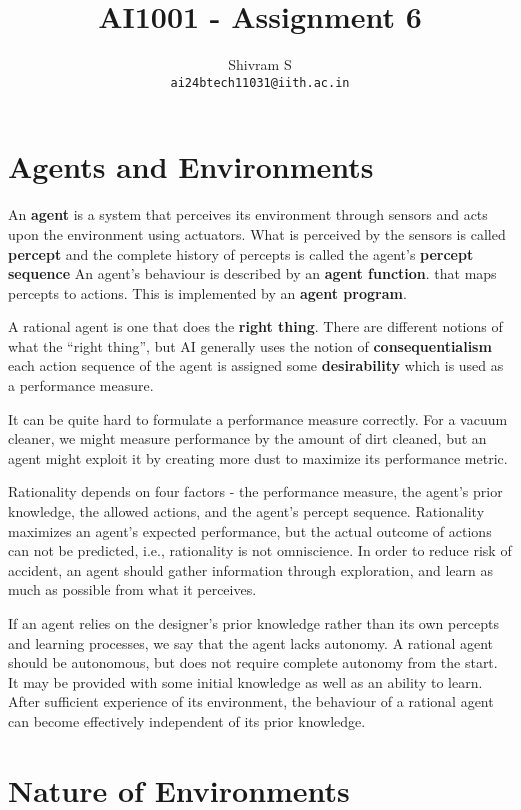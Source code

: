 \documentclass{article}
\author{Shivram S \\ \texttt{ai24btech11031@iith.ac.in}}
\title{AI1001 - Assignment 6}
\begin{document}
\maketitle

\section{Agents and Environments}

An \textbf{agent} is a system that perceives its environment through sensors and acts
upon the environment using actuators. What is perceived by the sensors is called
\textbf{percept} and the complete history of percepts is called the agent's
\textbf{percept sequence} An agent's behaviour is described by an \textbf{agent function}.
that maps percepts to actions. This is implemented by an \textbf{agent program}.

A rational agent is one that does the \textbf{right thing}. There are different notions
of what the ``right thing'', but AI generally uses the notion of \textbf{consequentialism} 
each action sequence of the agent is assigned some \textbf{desirability} which is used
as a performance measure.

It can be quite hard to formulate a performance measure correctly. For a vacuum cleaner,
we might measure performance by the amount of dirt cleaned, but an agent might exploit it
by creating more dust to maximize its performance metric.

Rationality depends on four factors - the performance measure, the agent's prior knowledge,
the allowed actions, and the agent's percept sequence. Rationality maximizes an agent's
expected performance, but the actual outcome of actions can not be predicted, i.e.,
rationality is not omniscience. In order to reduce risk of accident, an agent should gather
information through exploration, and learn as much as possible from what it perceives. 

If an agent relies on the designer's prior knowledge rather than its own percepts and 
learning processes, we say that the agent lacks autonomy. A rational agent should be
autonomous, but does not require complete autonomy from the start. It may be provided with
some initial knowledge as well as an ability to learn. After sufficient
experience of its environment, the behaviour of a rational agent can become effectively
independent of its prior knowledge.

\section{Nature of Environments}
\end{document}
